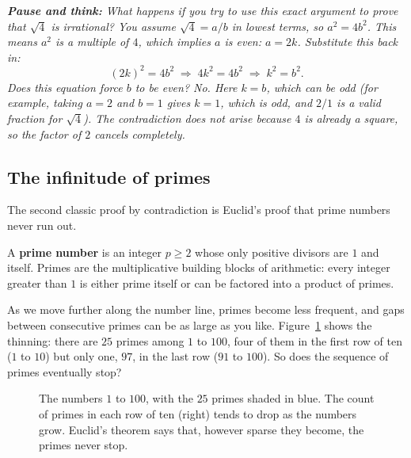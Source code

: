 \begin{center}
\itshape \textbf{Pause and think:} What happens if you try to use this exact argument to prove that $\sqrt{4}$ is irrational? You assume $\sqrt{4} = a/b$ in lowest terms, so $a^2 = 4b^2$. This means $a^2$ is a multiple of $4$, which implies $a$ is even: $a = 2k$. Substitute this back in:
\[
(2k)^2 = 4b^2 \;\Longrightarrow\; 4k^2 = 4b^2 \;\Longrightarrow\; k^2 = b^2.
\]
Does this equation force $b$ to be even? No. Here $k = b$, which can be odd (for example, taking $a = 2$ and $b = 1$ gives $k = 1$, which is odd, and $2/1$ is a valid fraction for $\sqrt{4}$). The contradiction does not arise because $4$ is already a square, so the factor of $2$ cancels completely.
\end{center}

\subsection{The infinitude of primes}

The second classic proof by contradiction is Euclid's proof that prime numbers never run out.

A \textbf{prime number} is an integer $p \ge 2$ whose only positive divisors are $1$ and itself. Primes are the multiplicative building blocks of arithmetic: every integer greater than $1$ is either prime itself or can be factored into a product of primes. 

As we move further along the number line, primes become less frequent, and gaps between consecutive primes can be as large as you like. Figure~\ref{08:fig-prime-grid} shows the thinning: there are $25$ primes among $1$ to $100$, four of them in the first row of ten ($1$ to $10$) but only one, $97$, in the last row ($91$ to $100$). So does the sequence of primes eventually stop?

\begin{figure}[htbp]
\centering
{}
\caption{The numbers $1$ to $100$, with the $25$ primes shaded in blue. The count of primes in each row of ten (right) tends to drop as the numbers grow. Euclid's theorem says that, however sparse they become, the primes never stop.}
\label{08:fig-prime-grid}
\end{figure}

